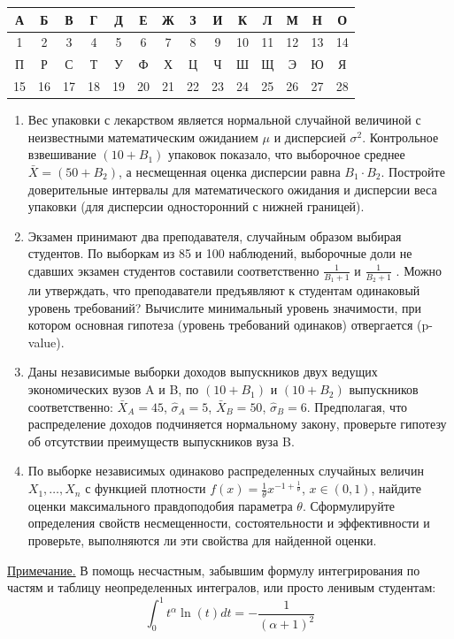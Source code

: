 \begin{center}
\begin{tabular}{|c|c|c|c|c|c|c|c|c|c|c|c|c|c|}
\hline  А & Б & В & Г & Д & Е & Ж & З & И & К & Л & М & Н & О \\
\hline 1 & 2 & 3 & 4 & 5 & 6 & 7 & 8 & 9 & 10 & 11 & 12 & 13 & 14 \\
\hline  П & Р & С & Т & У & Ф & Х & Ц & Ч & Ш & Щ & Э & Ю & Я \\
\hline 15& 16  &  17 &  18&  19&  20&  21& 22 & 23 &  24& 25 & 26  &  27 & 28 \\
\hline
\end{tabular}
\end{center}

\begin{enumerate}
\item Вес упаковки с лекарством является нормальной случайной величиной с
неизвестными математическим ожиданием  $\mu$ и дисперсией $\sigma^2$. Контрольное
взвешивание $(10+B_1)$ упаковок показало, что выборочное среднее  $\bar{X} =
(50+B_2)$, а  несмещенная оценка дисперсии равна $B_1\cdot B_2$. Постройте
доверительные интервалы для математического ожидания и дисперсии веса упаковки
(для дисперсии односторонний с нижней границей).

\item Экзамен принимают два преподавателя, случайным образом выбирая студентов.
По выборкам из 85 и 100 наблюдений, выборочные доли не сдавших экзамен студентов
составили соответственно $\frac{1}{B_1+1}$ и $\frac{1}{B_2+1}$ . Можно ли утверждать,
что преподаватели предъявляют к студентам одинаковый уровень требований? Вычислите
минимальный уровень значимости, при котором основная гипотеза (уровень требований одинаков)
отвергается (p-value).

\item Даны независимые выборки доходов выпускников двух ведущих экономических вузов
A и B, по $(10+B_1)$ и $(10+B_2)$ выпускников соответственно: $\bar{X}_A=45$,
$\hat{\sigma}_A=5$, $\bar{X}_B=50$, $\hat{\sigma}_B=6$.
Предполагая, что распределение доходов подчиняется нормальному закону, проверьте
гипотезу об отсутствии преимуществ выпускников вуза B.

\item 	По выборке независимых одинаково распределенных случайных величин
$X_1,\dots,X_n$ с функцией плотности $f(x)=\frac{1}{\theta} x^{-1+\frac{1}{\theta}}$,
$x\in(0, 1)$, найдите оценки максимального правдоподобия параметра $\theta$.
Сформулируйте определения свойств несмещенности, состоятельности и эффективности
и проверьте, выполняются ли эти свойства для найденной оценки.
\end{enumerate}
\underline{Примечание.} В помощь несчастным, забывшим формулу интегрирования по
частям и таблицу неопределенных интегралов, или просто ленивым студентам:
\[
\int_0^1 t^\alpha \ln(t) dt = -\frac{1}{(\alpha+1)^2}
\]

